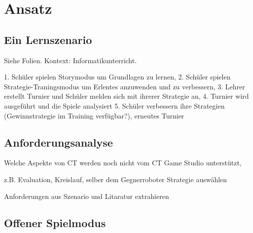 \chapter{Ansatz}

\section{Ein Lernszenario}

Siehe Folien. Kontext: Informatikunterricht.

1. Schüler spielen Storymodus um Grundlagen zu lernen,
2. Schüler spielen Strategie-Traningsmodus um Erlentes anzuwenden und zu verbessern,
3. Lehrer erstellt Turnier und Schüler melden sich mit ihrerer Strategie an,
4. Turnier wird ausgeführt und die Spiele analysiert
5. Schüler verbessern ihre Strategien (Gewinnstrategie im Training verfügbar?), erneutes Turnier

\section{Anforderungsanalyse}

Welche Aspekte von CT werden noch nicht vom CT Game Studio unterstützt,

z.B. Evaluation, Kreislauf, selber dem Gegnerroboter Strategie auswählen

Anforderungen aus Szenario und Litaratur extrahieren

\section{Offener Spielmodus}

